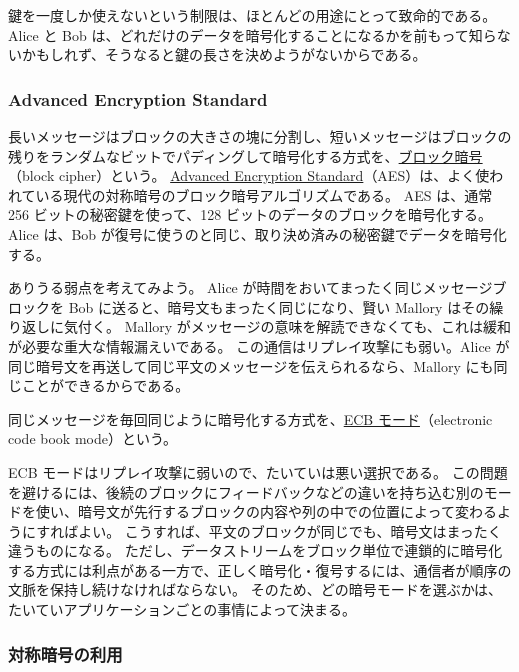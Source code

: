 \documentclass[uplatex]{jsarticle}
\def\label#1{}%
\begin{document}
鍵を一度しか使えないという制限は、ほとんどの用途にとって致命的である。
Alice と Bob は、どれだけのデータを暗号化することになるかを前もって知らないかもしれず、そうなると鍵の長さを決めようがないからである。

\subsubsection{Advanced Encryption Standard}

\begin{dfn}\label{dfn:ch5-aes}
長いメッセージはブロックの大きさの塊に分割し、短いメッセージはブロックの残りをランダムなビットでパディングして暗号化する方式を、\underline{ブロック暗号}（block cipher）という。
\underline{Advanced Encryption Standard}（AES）は、よく使われている現代の対称暗号のブロック暗号アルゴリズムである。
AES は、通常 256 ビットの秘密鍵を使って、128 ビットのデータのブロックを暗号化する。
Alice は、Bob が復号に使うのと同じ、取り決め済みの秘密鍵でデータを暗号化する。
\end{dfn}

ありうる弱点を考えてみよう。
Alice が時間をおいてまったく同じメッセージブロックを Bob に送ると、暗号文もまったく同じになり、賢い Mallory はその繰り返しに気付く。
Mallory がメッセージの意味を解読できなくても、これは緩和が必要な重大な情報漏えいである。
この通信はリプレイ攻撃にも弱い。Alice が同じ暗号文を再送して同じ平文のメッセージを伝えられるなら、Mallory にも同じことができるからである。

\begin{dfn}\label{dfn:ch5-ecb}
同じメッセージを毎回同じように暗号化する方式を、\underline{ECB モード}（electronic code book mode）という。
\end{dfn}

ECB モードはリプレイ攻撃に弱いので、たいていは悪い選択である。
この問題を避けるには、後続のブロックにフィードバックなどの違いを持ち込む別のモードを使い、暗号文が先行するブロックの内容や列の中での位置によって変わるようにすればよい。
こうすれば、平文のブロックが同じでも、暗号文はまったく違うものになる。
ただし、データストリームをブロック単位で連鎖的に暗号化する方式には利点がある一方で、正しく暗号化・復号するには、通信者が順序の文脈を保持し続けなければならない。
そのため、どの暗号モードを選ぶかは、たいていアプリケーションごとの事情によって決まる。

\subsubsection{対称暗号の利用}
\end{document}
